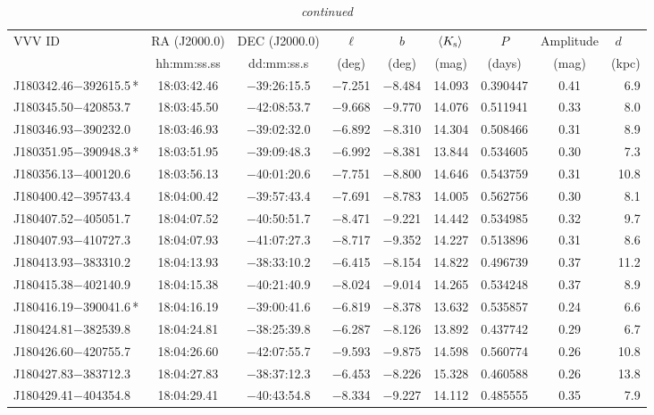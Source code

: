\begin{table*}
\centering
\caption[]{{\it continued}}
\begin{tabular}{lcccccccr}
\hline \hline
VVV ID & RA (J2000.0)  & DEC (J2000.0) & $\ell$ & $b$ &  $\langle K_{\rm s} \rangle$ & $P$ & Amplitude & $d$~~~ \\
     & hh:mm:ss.ss    & dd:mm:ss.s   &  (deg) & (deg) &   (mag)       & (days) & (mag) & (kpc)   \\
\hline
J180342.46$-$392615.5\,* & 18:03:42.46 & $-$39:26:15.5 & $-$7.251 & $-$8.484 & 14.093 & 0.390447 & 0.41 & 6.9 \\
J180345.50$-$420853.7 & 18:03:45.50 & $-$42:08:53.7 & $-$9.668 & $-$9.770 & 14.076 & 0.511941 & 0.33 & 8.0 \\
J180346.93$-$390232.0 & 18:03:46.93 & $-$39:02:32.0 & $-$6.892 & $-$8.310 & 14.304 & 0.508466 & 0.31 & 8.9 \\
J180351.95$-$390948.3\,* & 18:03:51.95 & $-$39:09:48.3 & $-$6.992 & $-$8.381 & 13.844 & 0.534605 & 0.30 & 7.3 \\
J180356.13$-$400120.6 & 18:03:56.13 & $-$40:01:20.6 & $-$7.751 & $-$8.800 & 14.646 & 0.543759 & 0.31 & 10.8 \\
J180400.42$-$395743.4 & 18:04:00.42 & $-$39:57:43.4 & $-$7.691 & $-$8.783 & 14.005 & 0.562756 & 0.30 & 8.1 \\
J180407.52$-$405051.7 & 18:04:07.52 & $-$40:50:51.7 & $-$8.471 & $-$9.221 & 14.442 & 0.534985 & 0.32 & 9.7 \\
J180407.93$-$410727.3 & 18:04:07.93 & $-$41:07:27.3 & $-$8.717 & $-$9.352 & 14.227 & 0.513896 & 0.31 & 8.6 \\
J180413.93$-$383310.2 & 18:04:13.93 & $-$38:33:10.2 & $-$6.415 & $-$8.154 & 14.822 & 0.496739 & 0.37 & 11.2 \\
J180415.38$-$402140.9 & 18:04:15.38 & $-$40:21:40.9 & $-$8.024 & $-$9.014 & 14.265 & 0.534248 & 0.37 & 8.9 \\
J180416.19$-$390041.6\,* & 18:04:16.19 & $-$39:00:41.6 & $-$6.819 & $-$8.378 & 13.632 & 0.535857 & 0.24 & 6.6 \\
J180424.81$-$382539.8 & 18:04:24.81 & $-$38:25:39.8 & $-$6.287 & $-$8.126 & 13.892 & 0.437742 & 0.29 & 6.7 \\
J180426.60$-$420755.7 & 18:04:26.60 & $-$42:07:55.7 & $-$9.593 & $-$9.875 & 14.598 & 0.560774 & 0.26 & 10.8 \\
J180427.83$-$383712.3 & 18:04:27.83 & $-$38:37:12.3 & $-$6.453 & $-$8.226 & 15.328 & 0.460588 & 0.26 & 13.8 \\
J180429.41$-$404354.8 & 18:04:29.41 & $-$40:43:54.8 & $-$8.334 & $-$9.227 & 14.112 & 0.485555 & 0.35 & 7.9 \\

\end{tabular}
\end{table*}
